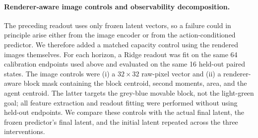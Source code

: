 \documentclass{article}
\begin{document}
\paragraph{Renderer-aware image controls and observability decomposition.}
The preceding readout uses only frozen latent vectors, so a failure could in
principle arise either from the image encoder or from the action-conditioned
predictor. We therefore added a matched capacity control using the rendered
images themselves. For each horizon, a Ridge readout was fit on the same 64
calibration endpoints used above and evaluated on the same 16 held-out paired
states. The image controls were (i) a $32\times32$ raw-pixel vector and (ii)
a renderer-aware block mask containing the block centroid, second moments,
area, and the agent centroid. The latter targets the grey-blue movable block,
not the light-green goal; all feature extraction and readout fitting were
performed without using held-out endpoints. We compare these controls with
the actual final latent, the frozen predictor's final latent, and the initial
latent repeated across the three interventions.

\begin{table}[H]
\centering
\scriptsize
\setlength{\tabcolsep}{3pt}
\caption{Image-capacity controls for frozen physical observability. Entries
are mean block-position endpoint errors in pixels for the $+a$ arm over 16
held-out cases; the machine-readable artifact reports episode-bootstrap 95\%
intervals and the corresponding $-a$ and zero arms. The calibration set is
disjoint from the held-out cases.}
\label{tab:supp-observability-decomposition}
\end{table}
\end{document}
